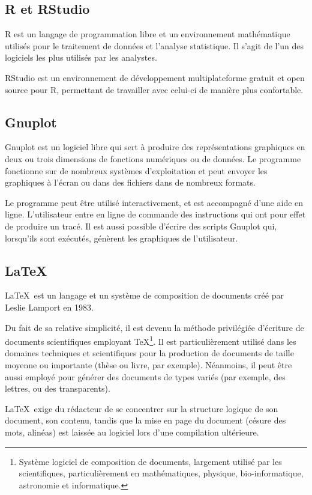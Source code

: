 		
	\subsection{R et RStudio}
		R est un langage de programmation libre et un environnement mathématique utilisés pour le traitement de données et l'analyse statistique. Il s'agit de l'un des logiciels les plus utilisés par les analystes.
		
		RStudio est un environnement de développement multiplateforme gratuit et open source pour R, permettant de travailler avec celui-ci de manière plus confortable.


	\subsection{Gnuplot}
		Gnuplot est un logiciel libre qui sert à produire des représentations graphiques en deux ou trois dimensions de fonctions numériques ou de données. Le programme fonctionne sur de nombreux systèmes d'exploitation et peut envoyer les graphiques à l'écran ou dans des fichiers dans de nombreux formats.
		
		Le programme peut être utilisé interactivement, et est accompagné d'une aide en ligne. L'utilisateur entre en ligne de commande des instructions qui ont pour effet de produire un tracé. Il est aussi possible d'écrire des scripts Gnuplot qui, lorsqu'ils sont exécutés, génèrent les graphiques de l'utilisateur.
	
	
	\subsection{\LaTeX}
		\LaTeX~est un langage et un système de composition de documents créé par Leslie Lamport en 1983.

		Du fait de sa relative simplicité, il est devenu la méthode privilégiée d'écriture de documents scientifiques employant TeX\footnote{Système logiciel de composition de documents, largement utilisé par les scientifiques, particulièrement en mathématiques, physique, bio-informatique, astronomie et informatique.}. Il est particulièrement utilisé dans les domaines techniques et scientifiques pour la production de documents de taille moyenne ou importante (thèse ou livre, par exemple). Néanmoins, il peut être aussi employé pour générer des documents de types variés (par exemple, des lettres, ou des transparents).
		
		\LaTeX~exige du rédacteur de se concentrer sur la structure logique de son document, son contenu, tandis que la mise en page du document (césure des mots, alinéas) est laissée au logiciel lors d'une compilation ultérieure.
		

